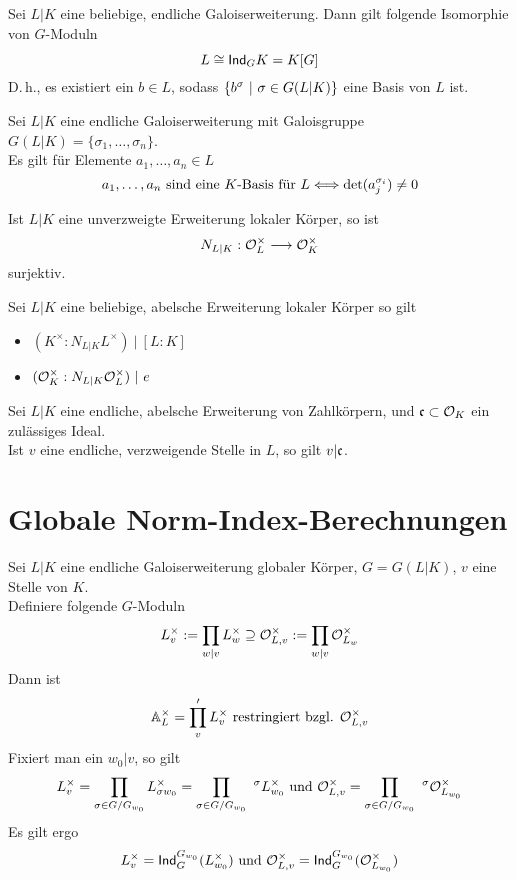 Sei $L|K$ eine beliebige, endliche Galoiserweiterung. Dann gilt folgende Isomorphie von $G$-Moduln
\[ L \overset{}{\cong} \textsf{Ind}_GK = K[G] \]
D.\,h., es existiert ein $b \in L$, sodass $\set{b^\sigma}{\sigma \in G(L|K)}$ eine Basis von $L$ ist.

\Lem{}
Sei $L|K$ eine endliche Galoiserweiterung mit Galoisgruppe $G(L|K) = \{\sigma_1, \ldots, \sigma_n\}$.\\
Es gilt für Elemente $a_1,\ldots, a_n \in L$
\[ a_1,\ldots, a_n \text{ sind eine }K\text{-Basis für }L \overset{}{\Longleftrightarrow} \det(a_j^{\sigma_i}) \neq 0 \]

\Kor{}
Ist $L|K$ eine unverzweigte Erweiterung lokaler Körper, so ist
\[ N_{L|K} : \mathcal{O}_L^\times \overset{}{\longrightarrow} \mathcal{O}_K^\times \]
surjektiv.

\Kor{}
Sei $L|K$ eine beliebige, abelsche Erweiterung lokaler Körper so gilt
\begin{itemize}
\item $(K^\times : N_{L|K} L^\times ) ~|~ [L:K]$
\item $(\mathcal{O}_K^\times : N_{L|K} \mathcal{O}_L^\times ) ~|~ e$
\end{itemize}

\Bem{}
Sei $L|K$ eine endliche, abelsche Erweiterung von Zahlkörpern, und $\mathfrak{c} \subset \mathcal{O}_K$ ein zulässiges Ideal.\\
Ist $v$ eine endliche, verzweigende Stelle in $L$, so gilt $v | \mathfrak{c}$.

\section{Globale Norm-Index-Berechnungen}
\Def{}
Sei $L|K$ eine endliche Galoiserweiterung globaler Körper, $G = G(L|K)$, $v$ eine Stelle von $K$.\\
Definiere folgende $G$-Moduln
\[ L_v^\times := \prod_{w|v} L_w^\times \supseteq \mathcal{O}_{L,v}^\times := \prod_{w|v}\mathcal{O}_{L_w}^\times \]
Dann ist
\[ \mathbb{A}_L^\times = \prod'_vL_v^\times \text{ restringiert bzgl. } \mathcal{O}_{L,v}^\times  \]
Fixiert man ein $w_0|v$, so gilt
\[ L_v^\times = \prod_{\sigma \in G/G_{w_0}} L_{\sigma w_0}^\times = \prod_{\sigma \in G/G_{w_0}} \ ^\sigma L_{w_0}^\times \text{ und } \O_{L,v}^\times = \prod_{\sigma \in G/G_{w_0}} \ ^\sigma \O_{L_{w_0}}^\times \]
Es gilt ergo
\[ L^\times_v = \textsf{Ind}_G^{G_{w_0}} (L_{w_0}^\times) \text{ und } \mathcal{O}^\times_{L, v} = \textsf{Ind}_G^{G_{w_0}} (\mathcal{O}_{L_{w_0}}^\times) \]

